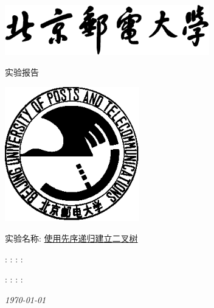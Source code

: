 \begin{titlepage}
    \center
    \includegraphics[width=3.5in]{images/buptname.eps}

    \begin{spacing}{5}
        {\bigsize 实验报告}
    \end{spacing}

    \includegraphics[width=2.3in]{images/buptseal.eps}

    \begin{spacing}{1}
        \vspace{2.5cm}
        \Large{实验名称:} \underline{使用先序递归建立二叉树}
        \vspace{3cm}
    \end{spacing}

    \begin{minipage}{\linewidth}
         : \underline{}
         : \underline{}
         : \underline{}
         : \underline{}
    \end{minipage}

    \begin{minipage}{\linewidth}
         : \underline{}
         : \underline{}
         : \underline{}
         : \underline{}
    \end{minipage}

    {\small\em \today }
\end{titlepage}

